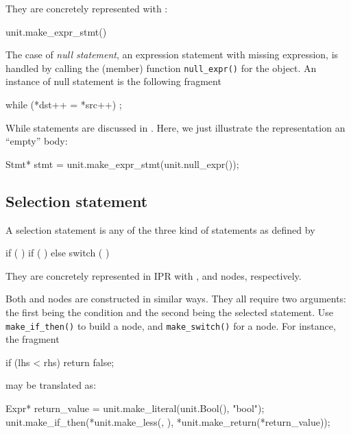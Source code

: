 \documentclass[11pt]{article}
\begin{document}
They are concretely represented with :
\begin{Program}
           unit.make_expr_stmt()
\end{Program}
The case of \emph{null statement}, \ie{} an expression statement with
missing expression, is handled by calling the (member) function
\verb=null_expr()= for the  object.  An instance of null
statement is the following fragment
\begin{Program}
  while (*dst++ = *src++)
     ;
\end{Program}
While statements are discussed in .  Here, we
just illustrate the representation an ``empty'' body:
\begin{Program}
  Stmt* stmt = unit.make_expr_stmt(unit.null_expr());
\end{Program}

\subsection{Selection statement}
\label{sec:stmt.selection}

A selection statement is any of the three kind of statements as defined by 
\begin{Grammar}
      if (  ) 
      if (  )  else 
      switch (  ) 
\end{Grammar}
They are concretely represented in IPR with ,
 and  nodes,
respectively. 

Both  and  nodes are
constructed in similar ways. They all require two arguments: the first being
the condition and the second being the selected statement.  Use
\texttt{make\_if\_then()} to build a  node, and
\texttt{make\_switch()} for a   node.
 For instance, the fragment
\begin{Program}
  if (lhs < rhs)
     return false;
\end{Program}
may be translated as:
\begin{Program}
  Expr* return_value = unit.make_literal(unit.Bool(), "bool");
  unit.make_if_then(*unit.make_less(, ),
                    *unit.make_return(*return_value));
\end{Program}
\end{document}
